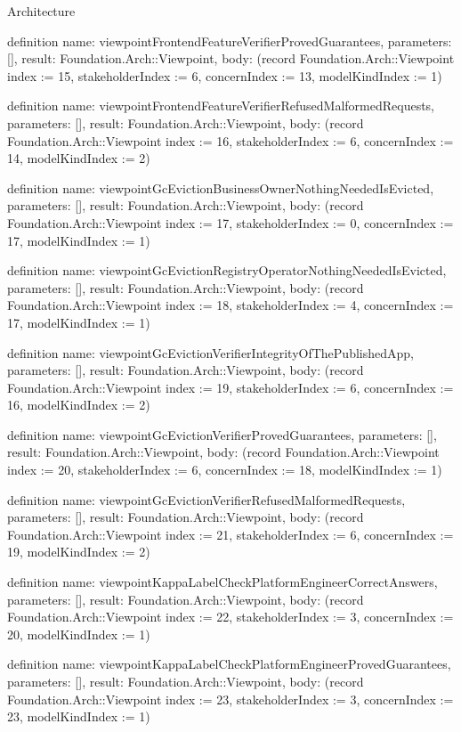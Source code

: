 \begin{lexlean}{Architecture}
\begin{semanticmodule}
definition{
  name: viewpointFrontendFeatureVerifierProvedGuarantees,
  parameters: [],
  result: Foundation.Arch::Viewpoint,
  body: (record Foundation.Arch::Viewpoint {index := 15, stakeholderIndex := 6, concernIndex := 13, modelKindIndex := 1})
}

definition{
  name: viewpointFrontendFeatureVerifierRefusedMalformedRequests,
  parameters: [],
  result: Foundation.Arch::Viewpoint,
  body: (record Foundation.Arch::Viewpoint {index := 16, stakeholderIndex := 6, concernIndex := 14, modelKindIndex := 2})
}

definition{
  name: viewpointGcEvictionBusinessOwnerNothingNeededIsEvicted,
  parameters: [],
  result: Foundation.Arch::Viewpoint,
  body: (record Foundation.Arch::Viewpoint {index := 17, stakeholderIndex := 0, concernIndex := 17, modelKindIndex := 1})
}

definition{
  name: viewpointGcEvictionRegistryOperatorNothingNeededIsEvicted,
  parameters: [],
  result: Foundation.Arch::Viewpoint,
  body: (record Foundation.Arch::Viewpoint {index := 18, stakeholderIndex := 4, concernIndex := 17, modelKindIndex := 1})
}

definition{
  name: viewpointGcEvictionVerifierIntegrityOfThePublishedApp,
  parameters: [],
  result: Foundation.Arch::Viewpoint,
  body: (record Foundation.Arch::Viewpoint {index := 19, stakeholderIndex := 6, concernIndex := 16, modelKindIndex := 2})
}

definition{
  name: viewpointGcEvictionVerifierProvedGuarantees,
  parameters: [],
  result: Foundation.Arch::Viewpoint,
  body: (record Foundation.Arch::Viewpoint {index := 20, stakeholderIndex := 6, concernIndex := 18, modelKindIndex := 1})
}

definition{
  name: viewpointGcEvictionVerifierRefusedMalformedRequests,
  parameters: [],
  result: Foundation.Arch::Viewpoint,
  body: (record Foundation.Arch::Viewpoint {index := 21, stakeholderIndex := 6, concernIndex := 19, modelKindIndex := 2})
}

definition{
  name: viewpointKappaLabelCheckPlatformEngineerCorrectAnswers,
  parameters: [],
  result: Foundation.Arch::Viewpoint,
  body: (record Foundation.Arch::Viewpoint {index := 22, stakeholderIndex := 3, concernIndex := 20, modelKindIndex := 1})
}

definition{
  name: viewpointKappaLabelCheckPlatformEngineerProvedGuarantees,
  parameters: [],
  result: Foundation.Arch::Viewpoint,
  body: (record Foundation.Arch::Viewpoint {index := 23, stakeholderIndex := 3, concernIndex := 23, modelKindIndex := 1})
}


\end{semanticmodule}
\end{lexlean}
